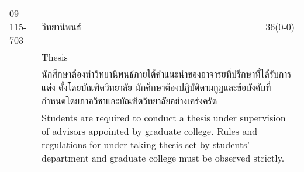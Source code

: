 \begin{longtable}{p{}p{}r{}}
09-115-703 & วิทยานิพนธ์ & 36(0-0)\\*
 & Thesis & \phantom{x} \vspace{3mm} \\*
&  \multicolumn{2}{p{0.75\textwidth}}{นักศึกษาต้องทำวิทยานิพนธ์ภายใต้คำแนะนำของอาจารยที่ปรึกษาที่ได้รับการแต่ง ตั้งโดยบัณฑิตวิทยาลัย นักศึกษาต้องปฏิบัติตามกูฏและข้อบังคับที่กำหนดโดยภาควิชาและบัณฑิตวิทยาลัยอย่างเคร่งครัด} \vspace{3mm} \\*
&  \multicolumn{2}{p{0.75\textwidth}}{Students are required to conduct a thesis under supervision of advisors appointed by graduate college. Rules and regulations for under taking thesis set by students’ department and graduate college must be observed strictly.} \vspace{8mm} \\*
\end{longtable}
